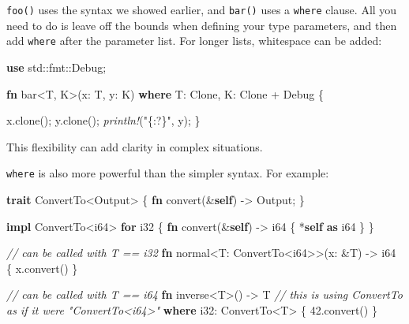 \documentclass[a4paper,]{book}
\newenvironment{Shaded}{\begin{snugshade}}{\end{snugshade}}
\newcommand{\KeywordTok}[1]{\textcolor[rgb]{0.13,0.29,0.53}{\textbf{{#1}}}}
\newcommand{\DataTypeTok}[1]{\textcolor[rgb]{0.13,0.29,0.53}{{#1}}}
\newcommand{\DecValTok}[1]{\textcolor[rgb]{0.00,0.00,0.81}{{#1}}}
\newcommand{\StringTok}[1]{\textcolor[rgb]{0.31,0.60,0.02}{{#1}}}
\newcommand{\CommentTok}[1]{\textcolor[rgb]{0.56,0.35,0.01}{\textit{{#1}}}}
\newcommand{\BuiltInTok}[1]{{#1}}
\newcommand{\PreprocessorTok}[1]{\textcolor[rgb]{0.56,0.35,0.01}{\textit{{#1}}}}
\newcommand{\NormalTok}[1]{{#1}}
\begin{document}
\texttt{foo()} uses the syntax we showed earlier, and \texttt{bar()}
uses a \texttt{where} clause. All you need to do is leave off the bounds
when defining your type parameters, and then add \texttt{where} after
the parameter list. For longer lists, whitespace can be added:

\begin{Shaded}
\begin{Highlighting}[]
\KeywordTok{use} \NormalTok{std::fmt::}\BuiltInTok{Debug}\NormalTok{;}

\KeywordTok{fn} \NormalTok{bar<T, K>(x: T, y: K)}
    \KeywordTok{where} \NormalTok{T: }\BuiltInTok{Clone}\NormalTok{,}
          \NormalTok{K: }\BuiltInTok{Clone} \NormalTok{+ }\BuiltInTok{Debug} \NormalTok{\{}

    \NormalTok{x.clone();}
    \NormalTok{y.clone();}
    \PreprocessorTok{println!}\NormalTok{(}\StringTok{"\{:?\}"}\NormalTok{, y);}
\NormalTok{\}}
\end{Highlighting}
\end{Shaded}

This flexibility can add clarity in complex situations.

\texttt{where} is also more powerful than the simpler syntax. For
example:

\begin{Shaded}
\begin{Highlighting}[]
\KeywordTok{trait} \NormalTok{ConvertTo<Output> \{}
    \KeywordTok{fn} \NormalTok{convert(&}\KeywordTok{self}\NormalTok{) -> Output;}
\NormalTok{\}}

\KeywordTok{impl} \NormalTok{ConvertTo<}\DataTypeTok{i64}\NormalTok{> }\KeywordTok{for} \DataTypeTok{i32} \NormalTok{\{}
    \KeywordTok{fn} \NormalTok{convert(&}\KeywordTok{self}\NormalTok{) -> }\DataTypeTok{i64} \NormalTok{\{ *}\KeywordTok{self} \KeywordTok{as} \DataTypeTok{i64} \NormalTok{\}}
\NormalTok{\}}

\CommentTok{// can be called with T == i32}
\KeywordTok{fn} \NormalTok{normal<T: ConvertTo<}\DataTypeTok{i64}\NormalTok{>>(x: &T) -> }\DataTypeTok{i64} \NormalTok{\{}
    \NormalTok{x.convert()}
\NormalTok{\}}

\CommentTok{// can be called with T == i64}
\KeywordTok{fn} \NormalTok{inverse<T>() -> T}
        \CommentTok{// this is using ConvertTo as if it were "ConvertTo<i64>"}
        \KeywordTok{where} \DataTypeTok{i32}\NormalTok{: ConvertTo<T> \{}
    \DecValTok{42.}\NormalTok{convert()}
\NormalTok{\}}
\end{Highlighting}
\end{Shaded}
\end{document}
